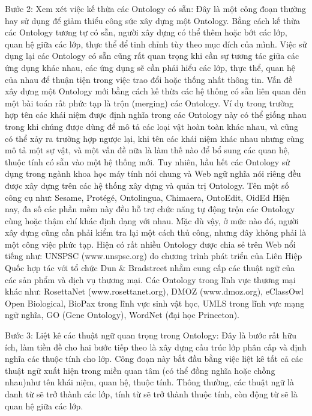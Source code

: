 Bước 2: Xem xét việc kế thừa các Ontology có sẵn:
Đây là một công đoạn thường hay sử dụng để giảm thiểu công sức xây dựng một Ontology. Bằng cách kế thừa các Ontology tương tự có sẵn, người xây dựng có thể thêm hoặc bớt các lớp, quan hệ giữa các lớp, thực thể để tinh chỉnh tùy theo mục đích của mình. Việc sử dụng lại các Ontology có sẵn cũng rất quan trọng khi cần sự tương tác giữa các ứng dụng khác nhau, các ứng dụng sẽ cần phải hiểu các lớp, thực thể, quan hệ của nhau để thuận tiện trong việc trao đổi hoặc thống nhất thông tin.
Vấn đề xây dựng một Ontology mới bằng cách kế thừa các hệ thống có sẵn liên quan đến một bài toán rất phức tạp là trộn (merging) các Ontology. Ví dụ trong trường hợp tên các khái niệm được định nghĩa trong các Ontology này có thể giống nhau trong khi chúng được dùng để mô tả các loại vật hoàn toàn khác nhau, và cũng có thể xảy ra trường hợp ngược lại, khi tên các khái niệm khác nhau nhưng cùng mô tả một sự vật, và một vấn đề nữa là làm thế nào để bổ sung các quan hệ, thuộc tính có sẵn vào một hệ thống mới. Tuy nhiên, hầu hết các Ontology sử dụng trong ngành khoa học máy tính nói chung và Web ngữ nghĩa nói riêng đều được xây dựng trên các hệ thống xây dựng và quản trị Ontology. Tên một số công cụ như: Sesame, Protégé, Ontolingua, Chimaera, OntoEdit, OidEd Hiện nay, đa số các phần mềm này đều hỗ trợ chức năng tự động trộn các Ontology cùng hoặc thậm chí khác định dạng với nhau. Mặc dù vậy, ở mức nào đó, người xây dựng cũng cần phải kiểm tra lại một cách thủ công, nhưng đây không phải là một công việc phức tạp. Hiện có rất nhiều Ontology được chia sẻ trên Web nổi tiếng như: UNSPSC (www.unspsc.org) do chương trình phát triển của Liên Hiệp Quốc hợp tác với tổ chức Dun \& Bradstreet nhằm cung cấp các thuật ngữ của các sản phẩm và dịch vụ thương mại. Các
Ontology trong lĩnh vực thương mại khác như: RosettaNet (www.rosettanet.org), DMOZ (www.dmoz.org), eClassOwl Open Biological, BioPax trong lĩnh vực sinh vật học, UMLS trong lĩnh vực mạng ngữ nghĩa, GO (Gene Ontology), WordNet (đại học Princeton).

Bước 3: Liệt kê các thuật ngữ quan trọng trong Ontology:
Đây là bước rất hữu ích, làm tiền đề cho hai bước tiếp theo là xây dựng cấu trúc lớp phân cấp và định nghĩa các thuộc tính cho lớp. Công đoạn này bắt đầu bằng việc liệt kê tất cả các thuật ngữ xuất hiện trong miền quan tâm (có thể đồng nghĩa hoặc chồng nhau)như tên khái niệm, quan hệ, thuộc tính. Thông thường, các thuật ngữ là danh từ sẽ trở thành các lớp, tính từ sẽ trở thành thuộc tính, còn động từ sẽ là quan hệ giữa các lớp. 

